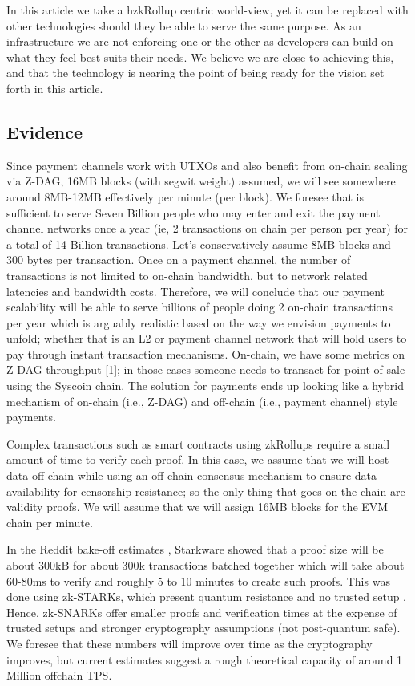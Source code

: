 \documentclass[peerreview]{ieeesyscoin}
\begin{document}
In this article we take a hzkRollup centric world-view, yet it can be replaced with other technologies should they be able to serve the same purpose. As an infrastructure we are not enforcing one or the other as developers can build on what they feel best suits their needs. We believe we are close to achieving this, and that the technology is nearing the point of being ready for the vision set forth in this article.

\subsection{Evidence}

Since payment channels work with UTXOs and also benefit from on-chain scaling via Z-DAG, 16MB blocks (with segwit weight) assumed, we will see somewhere around 8MB-12MB effectively per minute (per block). We foresee that is sufficient to serve Seven Billion people who may enter and exit the payment channel networks once a year (ie, 2 transactions on chain per person per year) for a total of 14 Billion transactions. Let’s conservatively assume 8MB blocks and 300 bytes per transaction. Once on a payment channel, the number of transactions is not limited to on-chain bandwidth, but to network related latencies and bandwidth costs. Therefore, we will conclude that our payment scalability will be able to serve billions of people doing 2 on-chain transactions per year which is arguably realistic based on the way we envision payments to unfold; whether that is an L2 or payment channel network that will hold users to pay through instant transaction mechanisms. On-chain, we have some metrics on Z-DAG throughput [1]; in those cases someone needs to transact for point-of-sale using the Syscoin chain. The solution for payments ends up looking like a hybrid mechanism of on-chain (i.e., Z-DAG) and off-chain (i.e., payment channel) style payments.

Complex transactions such as smart contracts using zkRollups require a small amount of time to verify each proof. In this case, we assume that we will host data off-chain while using an off-chain consensus mechanism to ensure data availability for censorship resistance; so the only thing that goes on the chain are validity proofs. We will assume that we will assign 16MB blocks for the EVM chain per minute. 

In the Reddit bake-off estimates \cite{Sta20a}, Starkware showed that a proof size will be about 300kB for about 300k transactions batched together which will take about 60-80ms to verify and roughly 5 to 10 minutes to create such proofs. This was done using zk-STARKs, which present quantum resistance and no trusted setup . Hence, zk-SNARKs offer smaller proofs and verification times at the expense of trusted setups and stronger cryptography assumptions (not post-quantum safe). We foresee that these numbers will improve over time as the cryptography improves, but current estimates suggest a rough theoretical capacity of around 1 Million offchain TPS. 
\end{document}
